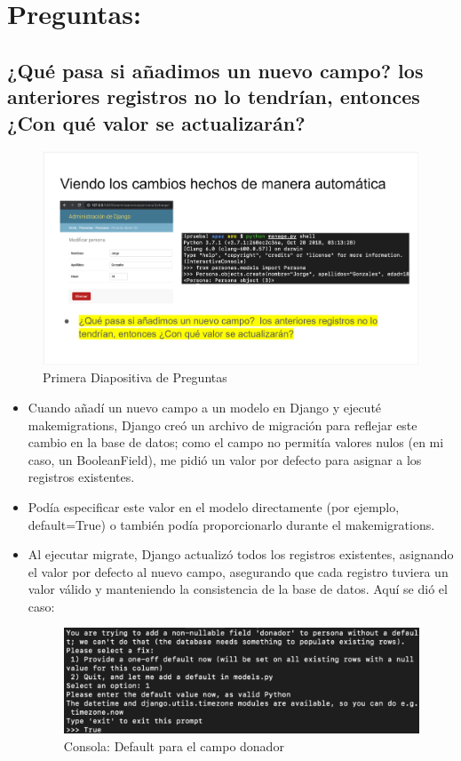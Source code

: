 \documentclass{article}
\begin{document}
    \section{Preguntas:}
        \subsection{¿Qué pasa si añadimos un nuevo campo?  los anteriores registros no lo tendrían, entonces ¿Con qué valor se actualizarán?}
        \begin{figure}[H]
            \centering
            \includegraphics[width=1\linewidth]{img/Pregunta1.png}
            \caption{Primera Diapositiva de Preguntas}
            \label{fig:enter-label}
        \end{figure}
        \begin{itemize}
            \item Cuando añadí un nuevo campo a un modelo en Django y ejecuté makemigrations, Django creó un archivo de migración para reflejar este cambio en la base de datos; como el campo no permitía valores nulos (en mi caso, un BooleanField), me pidió un valor por defecto para asignar a los registros existentes. 
            \item Podía especificar este valor en el modelo directamente (por ejemplo, default=True) o también podía proporcionarlo durante el makemigrations. 
            \item Al ejecutar migrate, Django actualizó todos los registros existentes, asignando el valor por defecto al nuevo campo, asegurando que cada registro tuviera un valor válido y manteniendo la consistencia de la base de datos. Aquí se dió el caso:
        \begin{figure}[H]
            \centering
            \includegraphics[width=0.8\linewidth]{img/DonadorDefault.png}
            \caption{Consola: Default para el campo donador}
            \label{fig:enter-label}
        \end{figure}
        \end{itemize}
\end{document}
